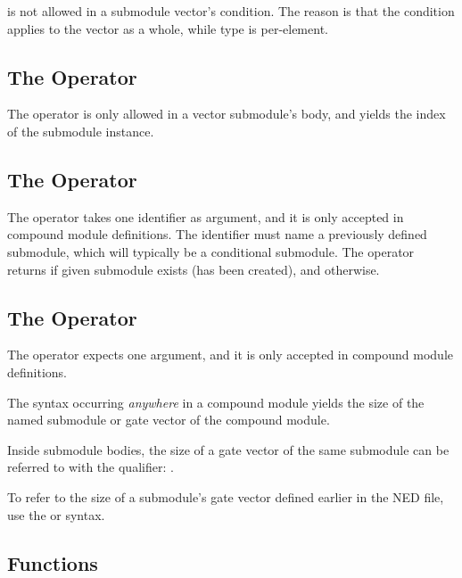  is not allowed in a submodule vector's  condition.
The reason is that the condition applies to the vector as a whole, while type
is per-element.


\subsection{The  Operator}
\label{sec:ned-ref:index-operator}

The  operator is only allowed in a vector submodule's body,
and yields the index of the submodule instance.


\subsection{The  Operator}
\label{sec:ned-ref:exists-operator}

The  operator takes one identifier as argument, and it 
is only accepted in compound module definitions. The identifier must name
a previously defined submodule, which will typically be a conditional submodule.
The operator returns  if given submodule exists (has been created), 
and  otherwise.


\subsection{The  Operator}
\label{sec:ned-ref:sizeof-operator}

The  operator expects one argument, and it is only accepted
in compound module definitions.

The  syntax occurring \textit{anywhere} in a compound
module yields the size of the named submodule or gate vector of the
compound module.

Inside submodule bodies, the size of a gate vector of the same submodule
can be referred to with the  qualifier: .

To refer to the size of a submodule's gate vector defined earlier in the
NED file, use the  or
 syntax.


\subsection{Functions}
\label{sec:ned-ref:functions}


